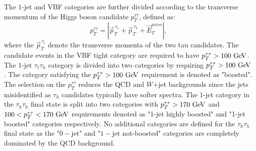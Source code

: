 The $1$-jet and VBF categories are further divided according to the transverse momentum of the Higgs boson candidate $p_{T}^{\tau\tau}$, defined as: 
\begin{equation} \label{eq:hpt}
p_{T}^{\tau\tau} = |\vec{p}_{T}^{\,\tau_1} + \vec{p}_{T}^{\,\tau_2} + \vec{E}_{T}^{miss}|,
\end{equation}
where the $\vec{p}_{T}^{\,\tau_i}$ denote the transverse momenta of the two tau candidates. The candidate events in the VBF tight category are required to have $p_{T}^{\tau\tau}>100~\mathrm{Ge\kern -0.1em V}$. The $1$-jet $\tau_{\ell}\tau_h$ category is divided into two categories by requiring $p_{T}^{\tau\tau}>100~\mathrm{Ge\kern -0.1em V}$. The category satisfying the $p_{T}^{\tau\tau}>100~\mathrm{Ge\kern -0.1em V}$ requirement is denoted as "boosted". The selection on the $p_{T}^{\tau\tau}$ reduces the QCD and $W$+jet backgrounds since the jets misidentified as $\tau_h$ candidates typically have softer spectra. The $1$-jet category in the $\tau_h\tau_h$ final state is split into two categories with $p_{T}^{\tau\tau}>170~\mathrm{Ge\kern -0.1em V}$ and $100<p_{T}^{\tau\tau}<170~\mathrm{Ge\kern -0.1em V}$ requirements denoted as "1-jet highly boosted" and "1-jet boosted" categories respectively.  No additional categories are defined for the  $\tau_h\tau_h$ final state as the "$0-$jet" and "$1-$jet not-boosted" categories are completely dominated by the QCD background.  

